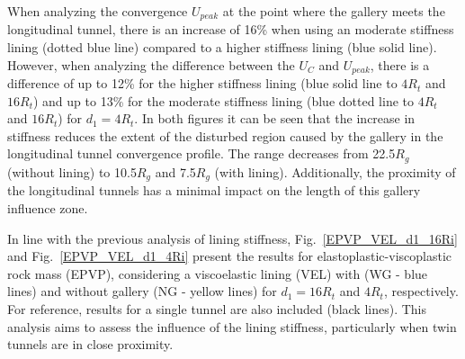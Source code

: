 \documentclass[a4paper,fleqn]{cas-sc}
\begin{document}
When analyzing the convergence $U_{peak}$ at the point where the gallery meets the longitudinal tunnel, there is an increase of 16\% when using an moderate stiffness lining (dotted blue line) compared to a higher stiffness lining (blue solid line). However, when analyzing the difference between the $U_{C}$ and $U_{peak}$, there is a difference of up to 12\% for the higher stiffness lining (blue solid line to $4R_t$ and $16R_t$) and up to 13\% for the moderate stiffness lining (blue dotted line to $4R_t$ and $16R_t$) for $d_1=4R_t$. In both figures it can be seen that the increase in stiffness reduces the extent of the disturbed region caused by the gallery in the longitudinal tunnel convergence profile. The range decreases from 22.5$R_g$ (without lining) to 10.5$R_g$ and 7.5$R_g$ (with lining). Additionally, the proximity of the longitudinal tunnels has a minimal impact on the length of this gallery influence zone.

In line with the previous analysis of lining stiffness, Fig.~\ref{EPVP_VEL_d1_16Ri} and Fig.~\ref{EPVP_VEL_d1_4Ri} present the results for elastoplastic-viscoplastic rock mass (EPVP), considering a viscoelastic lining (VEL) with (WG - blue lines) and without gallery (NG - yellow lines) for $d_1 = 16R_t$ and $4R_t$, respectively. For reference, results for a single tunnel are also included (black lines). This analysis aims to assess the influence of the lining stiffness, particularly when twin tunnels are in close proximity. 
\end{document}
